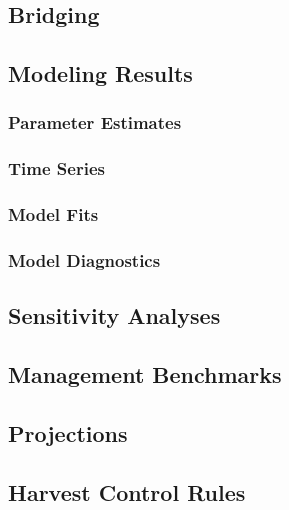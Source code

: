 \documentclass[
  letterpaper,
]{article}
\begin{document}
\subsection{Bridging}\label{bridging}

\newpage{}

\subsection{Modeling Results}\label{sec-assmt-results}

\subsubsection{Parameter Estimates}\label{parameter-estimates}

\subsubsection{Time Series}\label{time-series}

\subsubsection{Model Fits}\label{model-fits}

\subsubsection{Model Diagnostics}\label{model-diagnostics}

\newpage{}

\subsection{Sensitivity Analyses}\label{sec-assmt-sens}

\newpage{}

\subsection{Management Benchmarks}\label{sec-assmt-bench}

\newpage{}

\subsection{Projections}\label{sec-assmt-proj}

\newpage{}

\subsection{Harvest Control Rules}\label{harvest-control-rules}
\end{document}
